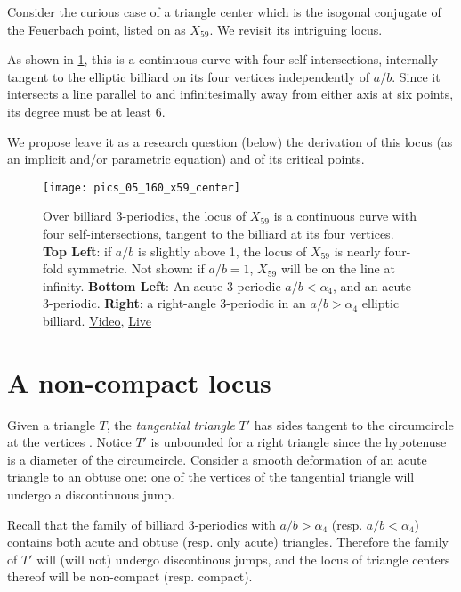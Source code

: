 Consider the curious case of a triangle center which is the isogonal conjugate of the Feuerbach point, listed on \cite{etc} as $X_{59}$. We revisit its intriguing locus. 

As shown in \cref{fig:05-x59-locus}, this is a continuous curve with four self-intersections, internally tangent to the elliptic billiard on its four vertices independently of $a/b$. Since it intersects a line parallel to and infinitesimally away from either axis at six points, its degree must be at least 6.

We propose leave it as a research question (below) the derivation of this locus (as an implicit and/or parametric equation) and of its critical points. 

\begin{figure}
    \centering
    \texttt{[image: pics\_05\_160\_x59\_center]}
    \caption{Over billiard 3-periodics, the locus of $X_{59}$ is a continuous curve with four self-intersections, tangent to the billiard at its four vertices. \textbf{Top Left}: if $a/b$ is slightly above 1, the locus of  $X_{59}$ is nearly four-fold symmetric. Not shown: if $a/b=1$, $X_{59}$ will be on the line at infinity. \textbf{Bottom Left}: An acute 3 periodic $a/b<\alpha_4$, and an acute 3-periodic. \textbf{Right}: a right-angle 3-periodic in an $a/b>\alpha_4$ elliptic billiard. \href{https://youtu.be/pl_PqSuhlx0}{Video}, \href{https://bit.ly/3fvDlZd}{Live}}
    \label{fig:05-x59-locus}
\end{figure}


\section{A non-compact locus}

Given a triangle $T$, the {\em tangential triangle} $T'$ has sides tangent to the circumcircle at the vertices \cite[Tangential triangle]{mw}. Notice $T'$ is unbounded for a right triangle since the hypotenuse is a diameter of the circumcircle. Consider a smooth deformation of an acute triangle to an obtuse one: one of the vertices of the tangential triangle will undergo a discontinuous jump.

Recall that the family of billiard 3-periodics with $a/b>\alpha_4$ (resp. $a/b<\alpha_4$) contains both acute and obtuse (resp. only acute) triangles. Therefore the family of $T'$ will (will not) undergo discontinous jumps, and the locus of triangle centers thereof will be non-compact (resp. compact).

